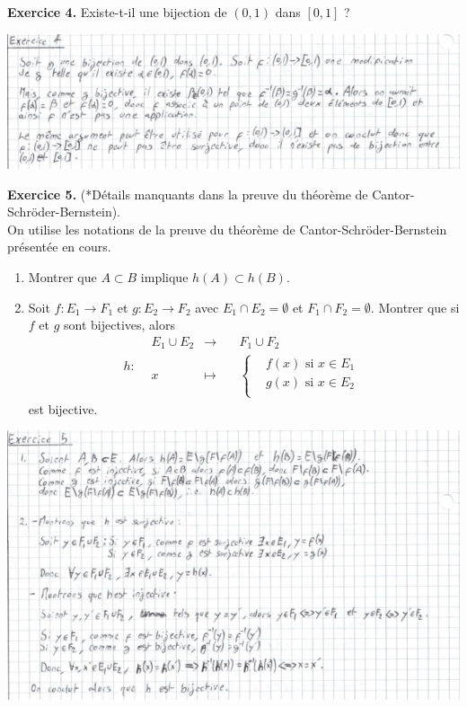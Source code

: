 \documentclass[a4paper, 10pt]{report}
\begin{document}
	\newpage
	
	\noindent
	\textbf{Exercice 4.} Existe-t-il une bijection de
	$(0,1)$ dans $[0,1]$ ?
	
	\includegraphics{ex04.jpg}
	
	\vspace{5mm}
	\noindent
	\textbf{Exercice 5.} (*Détails manquants dans la preuve du théorème
	de Cantor-Schröder-Bernstein).\\
	On utilise les notations de la preuve du théorème de
	Cantor-Schröder-Bernstein présentée en cours.
	\begin{enumerate}[label=\arabic*.]
		\item Montrer que $A \subset B$ implique $h(A) \subset h(B)$.
		\item Soit $f: E_1 \to F_1$ et $g: E_2 \to F_2$ avec
		$E_1 \cap E_2 = \emptyset$ et $F_1 \cap F_2 = \emptyset$.
		Montrer que si $f$ et $g$ sont bijectives, alors
		\[h: \begin{aligned}
			&E_1 \cup E_2 &\to \quad &F_1 \cup F_2\\
			&x &\mapsto \quad
				&\left\{\begin{aligned}
					&f(x) \text{ si } x \in E_1\\
					&g(x) \text{ si } x \in E_2\\
				\end{aligned}\right.
		\end{aligned}\]
		est bijective.
	\end{enumerate}
	
	\includegraphics{ex05.jpg}
	
	
	
	
\end{document}
